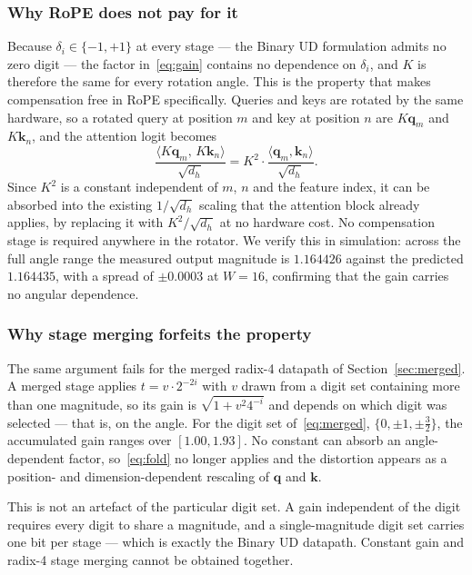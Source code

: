 \subsubsection{Why RoPE does not pay for it}
Because $\delta_i \in \{-1, +1\}$ at every stage --- the Binary UD formulation
admits no zero digit --- the factor in~\eqref{eq:gain} contains no dependence
on $\delta_i$, and $K$ is therefore the same for every rotation angle. This is
the property that makes compensation free in RoPE specifically. Queries and
keys are rotated by the same hardware, so a rotated query at position $m$ and
key at position $n$ are $K\mathbf{q}_m$ and $K\mathbf{k}_n$, and the attention
logit becomes
\begin{equation}
  \frac{\langle K\mathbf{q}_m,\, K\mathbf{k}_n \rangle}{\sqrt{d_h}}
  = K^2 \cdot \frac{\langle \mathbf{q}_m, \mathbf{k}_n \rangle}{\sqrt{d_h}} .
  \label{eq:fold}
\end{equation}
Since $K^2$ is a constant independent of $m$, $n$ and the feature index, it can
be absorbed into the existing $1/\sqrt{d_h}$ scaling that the attention block
already applies, by replacing it with $K^2/\sqrt{d_h}$ at no hardware cost. No
compensation stage is required anywhere in the rotator. We verify this in
simulation: across the full angle range the measured output magnitude is
$1.164426$ against the predicted $1.164435$, with a spread of $\pm 0.0003$ at
$W = 16$, confirming that the gain carries no angular dependence.

\subsubsection{Why stage merging forfeits the property}
The same argument fails for the merged radix-4 datapath of
Section~\ref{sec:merged}. A merged stage
applies $t = v \cdot 2^{-2i}$ with $v$ drawn from a digit set containing more
than one magnitude, so its gain is $\sqrt{1 + v^2 4^{-i}}$ and depends on which
digit was selected --- that is, on the angle. For the digit set of~\eqref{eq:merged},
$\{0, \pm 1, \pm \tfrac{3}{2}\}$, the accumulated gain ranges over $[1.00, 1.93]$. No
constant can absorb an angle-dependent factor, so~\eqref{eq:fold} no longer
applies and the distortion appears as a position- and dimension-dependent
rescaling of $\mathbf{q}$ and $\mathbf{k}$.

This is not an artefact of the particular digit set. A gain independent of the
digit requires every digit to share a magnitude, and a single-magnitude digit
set carries one bit per stage --- which is exactly the Binary UD datapath.
Constant gain and radix-4 stage merging cannot be obtained together.

